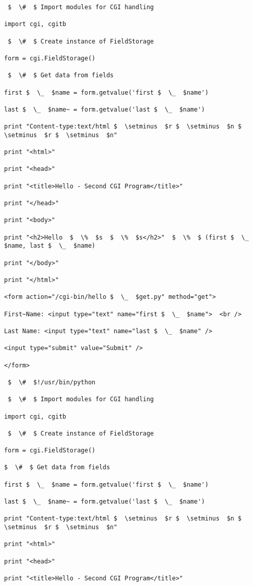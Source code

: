 \begin {enumerate}
\begin {enumerate}
\begin{verbatim}
 $  \#  $ Import modules for CGI handling

import cgi, cgitb

 $  \#  $ Create instance of FieldStorage

form = cgi.FieldStorage()

 $  \#  $ Get data from fields

first $  \_  $name = form.getvalue('first $  \_  $name')

last $  \_  $name~ = form.getvalue('last $  \_  $name')

print "Content-type:text/html $  \setminus  $r $  \setminus  $n $  \setminus  $r $  \setminus  $n"

print "<html>"

print "<head>"

print "<title>Hello - Second CGI Program</title>"

print "</head>"

print "<body>"

print "<h2>Hello  $  \%  $s  $  \%  $s</h2>"  $  \%  $ (first $  \_  $name, last $  \_  $name)

print "</body>"

print "</html>"

<form action="/cgi-bin/hello $  \_  $get.py" method="get">

First~Name: <input type="text" name="first $  \_  $name">  <br />

Last Name: <input type="text" name="last $  \_  $name" />

<input type="submit" value="Submit" />

</form>

 $  \#  $!/usr/bin/python

 $  \#  $ Import modules for CGI handling

import cgi, cgitb

 $  \#  $ Create instance of FieldStorage

form = cgi.FieldStorage()

$  \#  $ Get data from fields

first $  \_  $name = form.getvalue('first $  \_  $name')

last $  \_  $name~ = form.getvalue('last $  \_  $name')

print "Content-type:text/html $  \setminus  $r $  \setminus  $n $  \setminus  $r $  \setminus  $n"

print "<html>"

print "<head>"

print "<title>Hello - Second CGI Program</title>"


\end{verbatim}
\end{enumerate}
\end{enumerate}
